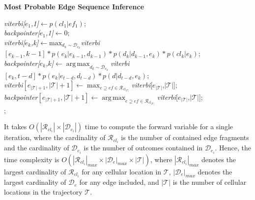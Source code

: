 \documentclass{vldb}
\DeclareMathOperator*{\argmax}{arg\,max}
\begin{document}
	\begin{algorithm}[!htp]
		\LinesNumbered
		\caption{{\bf Most Probable Edge Sequence Inference}}
		\label{alg:viterbi-hsmm-mv}
		{
			\textit{viterbi[$e_1$,1]}$\leftarrow  p(cl_1|ef_1)$;\\
			\textit{backpointer[$e_1$,1]}$\leftarrow 0$;\\
		}
		{
			{
				\textit{viterbi[$e_k$,k]}$\leftarrow  \mathrm{max}_{d_k\sim \mathcal{D}_{e_k}}$\textit{viterbi}$[e_{k-1},k-1]*p(e_k|e_{k-1}, d_{k-1})*p(d_k|d_{k-1},e_k)* p(cl_{k}|e_k)$;\\
				\textit{backpointer[$e_k$,$k$]}$\leftarrow \argmax_{d_k\sim \mathcal{D}_{e_k}}$\textit{viterbi}$[e_k,t-d]*p(e_k|e_{t-d}, d_{t-d})*p(d|d_{t-d},e_k)$;\\
			}
		}
		\textit{viterbi}$[e_{|\mathcal{T}|+1},|\mathcal{T}|+1]\leftarrow \max_{e\supseteq ef\in \mathcal{R}_{cl_{|\mathcal{T}|}}}$\textit{viterbi}[$e_{|\mathcal{T}|}$,$|\mathcal{T}|$];\\
		\textit{backpointer}$[e_{|\mathcal{T}|+1},|\mathcal{T}|+1]\leftarrow\argmax_{e\supseteq ef\in \mathcal{R}_{cl_{|\mathcal{T}|}}}$\textit{viterbi}[$e_{|\mathcal{T}|}$,$|\mathcal{T}|$];\\
		;
	\end{algorithm}
	
	It takes $O(|\mathcal{R}_{cl_i}|\times |\mathcal{D}_{e_i}|)$ time to compute the forward variable for a single iteration, where the cardinality of $\mathcal{R}_{cl_i}$ is the number of contained edge fragments and the cardinality of $\mathcal{D}_{e_i}$ is the number of outcomes contained in $\mathcal{D}_{e_i}$.
	Hence, the time complexity is $O(|\mathcal{R}_{cl_i}|_{max} \times |\mathcal{D}_{e}|_{max} \times |\mathcal{T}|)$, where $ |\mathcal{R}_{cl_i}|_{max}$ denotes the largest cardinality of $\mathcal{R}_{cl_i}$ for any cellular location in $\mathcal{T}$, $|\mathcal{D}_{e}|_{max}$ denotes the largest cardinality of $\mathcal{D}_{e}$ for any edge included, and $|\mathcal{T}|$ is the number of cellular locations in the trajectory $\mathcal{T}$.
	
\end{document}

